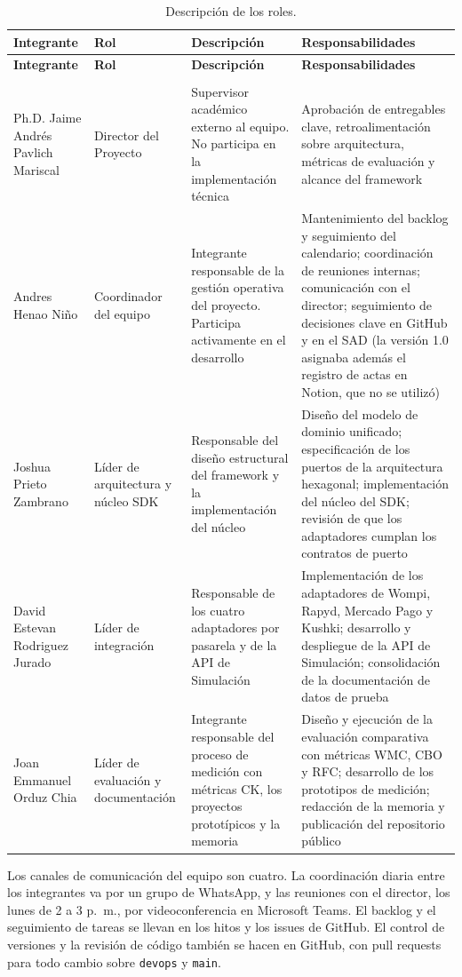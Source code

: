 \begin{center}
\renewcommand{\arraystretch}{1.2}
\begin{longtable}{|P{0.25}|P{0.25}|P{0.25}|P{0.25}|}
  \hline
  \textbf{Integrante} & \textbf{Rol} & \textbf{Descripción} & \textbf{Responsabilidades} \\
  \hline
  \endfirsthead
  \hline
  \textbf{Integrante} & \textbf{Rol} & \textbf{Descripción} & \textbf{Responsabilidades} \\
  \hline
  \endhead
  \caption{Descripción de los roles.}
  \label{tab:roles}\\
  \endlastfoot
  Ph.D. Jaime Andrés Pavlich Mariscal & Director del Proyecto & Supervisor académico externo al equipo. No participa en la implementación técnica & Aprobación de entregables clave, retroalimentación sobre arquitectura, métricas de evaluación y alcance del framework \\
  \hline
  Andres Henao Niño & Coordinador del equipo & Integrante responsable de la gestión operativa del proyecto. Participa activamente en el desarrollo & Mantenimiento del backlog y seguimiento del calendario; coordinación de reuniones internas; comunicación con el director; seguimiento de decisiones clave en GitHub y en el SAD (la versión 1.0 asignaba además el registro de actas en Notion, que no se utilizó) \\
  \hline
  Joshua Prieto Zambrano & Líder de arquitectura y núcleo SDK & Responsable del diseño estructural del framework y la implementación del núcleo & Diseño del modelo de dominio unificado; especificación de los puertos de la arquitectura hexagonal; implementación del núcleo del SDK; revisión de que los adaptadores cumplan los contratos de puerto \\
  \hline
  David Estevan Rodriguez Jurado & Líder de integración & Responsable de los cuatro adaptadores por pasarela y de la API de Simulación & Implementación de los adaptadores de Wompi, Rapyd, Mercado Pago y Kushki; desarrollo y despliegue de la API de Simulación; consolidación de la documentación de datos de prueba \\
  \hline
  Joan Emmanuel Orduz Chia & Líder de evaluación y documentación & Integrante responsable del proceso de medición con métricas CK, los proyectos prototípicos y la memoria & Diseño y ejecución de la evaluación comparativa con métricas WMC, CBO y RFC; desarrollo de los prototipos de medición; redacción de la memoria y publicación del repositorio público \\
  \hline
\end{longtable}
\end{center}

Los canales de comunicación del equipo son cuatro. La coordinación diaria entre los integrantes va por un grupo de WhatsApp, y las reuniones con el director, los lunes de 2 a 3 p.~m., por videoconferencia en Microsoft Teams. El backlog y el seguimiento de tareas se llevan en los hitos y los issues de GitHub. El control de versiones y la revisión de código también se hacen en GitHub, con pull requests para todo cambio sobre \texttt{devops} y \texttt{main}.
